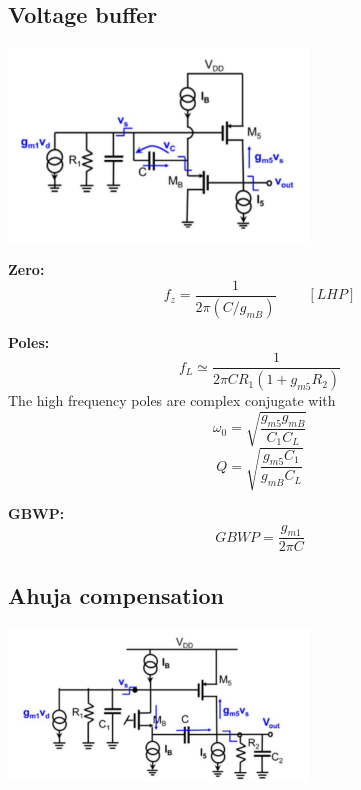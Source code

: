 \subsection{Voltage buffer}

\centering
\includegraphics[width=0.6\textwidth]{compVbuff.png}\\
\raggedright

{\bf Zero:}\\
\begin{equation}
f_z=\frac{1}{2\pi(C/g_{mB})}\ \ \ \ \ \ \ \ \ \ [LHP]
\end{equation}

{\bf Poles:}\\
\begin{equation}
f_L\simeq \frac{1}{2\pi CR_1(1+g_{m5}R_2)}
\end{equation}
The high frequency poles are complex conjugate with\\
\begin{equation}
\omega_0=\sqrt{\frac{g_{m5}g_{mB}}{C_1C_L}}
\end{equation}
\begin{equation}
Q=\sqrt{\frac{g_{m5}C_1}{g_{mB}C_L}}
\end{equation}

{\bf GBWP:}
\begin{equation}
GBWP=\frac{g_{m1}}{2\pi C}
\end{equation}

\subsection{Ahuja compensation}

\centering
\includegraphics[width=0.6\textwidth]{compAhuja.png}\\
\raggedright

